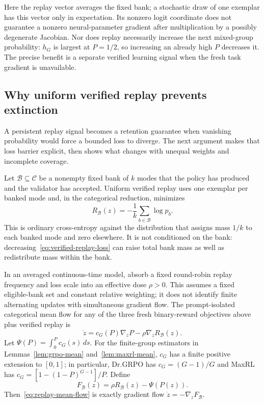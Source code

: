 \documentclass{article}
\newcommand{\1}{\mathbf 1}
\theoremstyle{remark}
\theoremstyle{definition}
\theoremstyle{plain}
\begin{document}
Here the replay vector averages the fixed bank; a stochastic draw of one
exemplar has this vector only in expectation. Its nonzero logit coordinate
does not guarantee a nonzero neural-parameter gradient after multiplication
by a possibly degenerate Jacobian. Nor does replay necessarily increase the
next mixed-group probability: $h_G$ is largest at $P=1/2$, so increasing an
already high $P$ decreases it. The precise benefit is a separate verified
learning signal when the fresh task gradient is unavailable.

\subsection{Why uniform verified replay prevents extinction}
\label{app:theory-replay}

A persistent replay signal becomes a retention guarantee when vanishing
probability would force a bounded loss to diverge. The next argument makes
that loss barrier explicit, then shows what changes with unequal weights
and incomplete coverage.

Let $\mathcal B\subseteq\mathcal C$ be a nonempty fixed bank of $k$ modes that
the policy has produced and the validator has accepted. Uniform verified replay
uses one exemplar per banked mode and, in the categorical reduction, minimizes
\begin{equation}
  R_{\mathcal B}(z)
  =-\frac1k\sum_{b\in\mathcal B}\log p_b.
  \label{eq:verified-replay-loss}
\end{equation}
This is ordinary cross-entropy against the distribution that assigns mass
$1/k$ to each banked mode and zero elsewhere. It is not conditioned on the
bank: decreasing~\eqref{eq:verified-replay-loss} can raise total bank mass as
well as redistribute mass within the bank.

In an averaged continuous-time model, absorb a fixed round-robin replay
frequency and loss scale into an effective dose $\rho>0$. This assumes a
fixed eligible-bank set and constant relative weighting; it does not identify
finite alternating updates with simultaneous gradient flow. The prompt-isolated categorical mean flow for any of the three fresh
binary-reward objectives above plus verified replay is
\begin{equation}
  \dot z
  =c_G(P)\nabla_zP-\rho\nabla_zR_{\mathcal B}(z).
  \label{eq:replay-mean-flow}
\end{equation}
Let $\Psi(P)=\int_0^P c_G(s)\,ds$. For the finite-group estimators in Lemmas~\ref{lem:grpo-mean}
and~\ref{lem:maxrl-mean}, $c_G$ has a finite positive extension to $[0,1]$;
in particular, Dr.GRPO has $c_G=(G-1)/G$ and MaxRL has
$c_G=[1-(1-P)^{G-1}]/P$. Define
\begin{equation}
  F_{\mathcal B}(z)=\rho R_{\mathcal B}(z)-\Psi(P(z)).
  \label{eq:replay-potential}
\end{equation}
Then~\eqref{eq:replay-mean-flow} is exactly gradient flow
$\dot z=-\nabla_zF_{\mathcal B}$.
\end{document}
